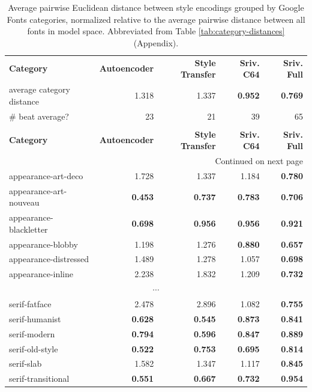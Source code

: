 \begin{longtable}{|l|r|r|r|r|}
\caption{Average pairwise Euclidean distance between style encodings grouped by Google Fonts categories, normalized relative to the average pairwise distance between all fonts in model space. Abbreviated from Table \ref{tab:category-distances} (Appendix).}
\label{tab:category-distances-short} \\
\hline
\textbf{Category} & \textbf{Autoencoder} & \textbf{Style Transfer} & \textbf{Sriv. C64} & \textbf{Sriv. Full} \\
\hhline{|=====|}
average category distance & 1.318 & 1.337 & \textbf{0.952} & \textbf{0.769} \\
\# beat average? & 23 & 21 & 39 & 65 \\
\hhline{|=====|}
\endfirsthead

\multicolumn{5}{c}{{Table \thetable\ continued from previous page}} \\[0.5em]
\hline
\textbf{Category} & \textbf{Autoencoder} & \textbf{Style Transfer} & \textbf{Sriv. C64} & \textbf{Sriv. Full} \\
\hline
\endhead

\hline \multicolumn{5}{r}{{Continued on next page}} \\
\endfoot

\hline
\endlastfoot

appearance-art-deco       & 1.728          & 1.337          & 1.184          & \textbf{0.780} \\
appearance-art-nouveau    & \textbf{0.453} & \textbf{0.737} & \textbf{0.783} & \textbf{0.706} \\
appearance-blackletter    & \textbf{0.698} & \textbf{0.956} & \textbf{0.956} & \textbf{0.921} \\
appearance-blobby         & 1.198          & 1.276          & \textbf{0.880} & \textbf{0.657} \\
appearance-distressed     & 1.489          & 1.278          & 1.057          & \textbf{0.698} \\
appearance-inline         & 2.238          & 1.832          & 1.209          & \textbf{0.732} \\
\hline
\multicolumn{5}{|c|}{$\cdots$} \\
\hline
serif-fatface             & 2.478          & 2.896          & 1.082          & \textbf{0.755} \\
serif-humanist            & \textbf{0.628} & \textbf{0.545} & \textbf{0.873} & \textbf{0.841} \\
serif-modern              & \textbf{0.794} & \textbf{0.596} & \textbf{0.847} & \textbf{0.889} \\
serif-old-style           & \textbf{0.522} & \textbf{0.753} & \textbf{0.695} & \textbf{0.814} \\
serif-slab                & 1.582          & 1.347          & 1.117          & \textbf{0.845} \\
serif-transitional        & \textbf{0.551} & \textbf{0.667} & \textbf{0.732} & \textbf{0.954} \\

\end{longtable}

